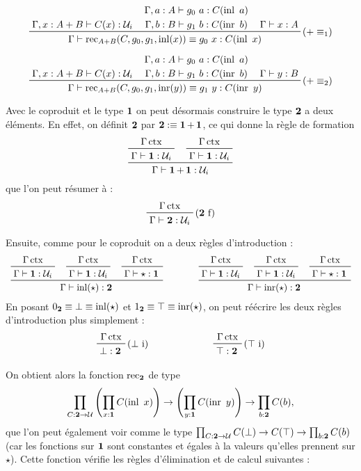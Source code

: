\documentclass[../../rapport.tex]{subfiles}
\begin{document}
  $$
  \prfinterspace=1.2em
  \prftree[r]{($+ \equiv_1$)}
    {\Gamma, x : A+B \vdash C(x) : \U_i}
    {\prfStackPremises
      {\Gamma, a : A \vdash g_0\ a : C(\inl\ a)}
      {\Gamma, b : B \vdash g_1\ b : C(\inr\ b)}}
    {\Gamma \vdash x : A}
  {\Gamma \vdash \rec_{A+B}(C, g_0, g_1, \inl(x)) \equiv g_0\ x : C(\inl\ x)}
  $$

  $$
  \prfinterspace=1.2em
  \prftree[r]{($+ \equiv_2$)}
    {\Gamma, x : A+B \vdash C(x) : \U_i}
    {\prfStackPremises
      {\Gamma, a : A \vdash g_0\ a : C(\inl\ a)}
      {\Gamma, b : B \vdash g_1\ b : C(\inr\ b)}}
    {\Gamma \vdash y : B}
  {\Gamma \vdash \rec_{A+B}(C, g_0, g_1, \inr(y)) \equiv g_1\ y : C(\inr\ y)}
  $$

  \begin{example}[Le type $\2$]
    \label{ex:type_2}
    Avec le coproduit et le type $\operatorname{\textbf{1}}$ on peut désormais construire le type $\2$ a deux éléments.
    En effet, on définit $\2$ par $\operatorname{\textbf{2}} :\equiv \operatorname{\textbf{1}} + \operatorname{\textbf{1}}$, ce qui donne la règle de formation
    $$
    \prfinterspace=1.2em
    \prftree{\prftree{\Gamma \ctx}{\Gamma \vdash \1 : \U_i}}{\prftree{\Gamma \ctx}{\Gamma \vdash \1 : \U_i}}
      {\Gamma \vdash \1 + \1 : \U_i}
    $$
    que l'on peut résumer à :
    $$
    \prftree[r]{($\2$ f)}{\Gamma \ctx}{\Gamma \vdash \2 : \U_i}
    $$

    Ensuite, comme pour le coproduit on a deux règles d'introduction :
    $$
    \prfinterspace=1.2em
    \begin{array}{cc}
      \prftree{\prftree{\Gamma \ctx}{\Gamma \vdash \1 : \U_i}}
	{\prftree{\Gamma \ctx}{\Gamma \vdash \1 : \U_i}}
	{\prftree{\Gamma \ctx}{\Gamma \vdash \star : \1}}
	{\Gamma \vdash \inl(\star) : \2} \hspace{1cm}
      &\prftree{\prftree{\Gamma \ctx}{\Gamma \vdash \1 : \U_i}}
	{\prftree{\Gamma \ctx}{\Gamma \vdash \1 : \U_i}}
	{\prftree{\Gamma \ctx}{\Gamma \vdash \star : \1}}
	  {\Gamma \vdash \inr(\star) : \2}
    \end{array}
    $$
    En posant $0_{\operatorname{\textbf{2}}} \equiv \bot \equiv \operatorname{inl}(\star)$ et $1_{\operatorname{\textbf{2}}} \equiv \top \equiv \operatorname{inr}(\star)$,
    on peut réécrire les deux règles d'introduction plus simplement :
    $$
    \begin{array}{cc}
      \prftree[r]{($\bot$ i)}{\Gamma \ctx}{\bot : \2} \hspace{2cm}
      & \prftree[r]{($\top$ i)}{\Gamma \ctx}{\top : \2}
    \end{array}
    $$

    On obtient alors la fonction $\operatorname{rec}_{\operatorname{\textbf{2}}}$ de type
    $$\prod_{C : \2 \fun \U} \left(\prod_{x:\1} C(\inl\ x)\right) \fun \left(\prod_{y:\1}C(\inr\ y)\right) \fun \prod_{b : \2} C(b),$$
    que l'on peut également voir comme le type $\prod_{C:\operatorname{\textbf{2}} \rightarrow \mathcal U}C(\bot) \rightarrow C(\top) \rightarrow \prod_{b:\operatorname{\textbf{2}}}C(b)$
    (car les fonctions sur $\operatorname{\textbf{1}}$ sont constantes et égales à la valeurs qu'elles prennent sur $\star$).
    Cette fonction vérifie les règles d'élimination et de calcul suivantes :


\end{example}
\end{document}
